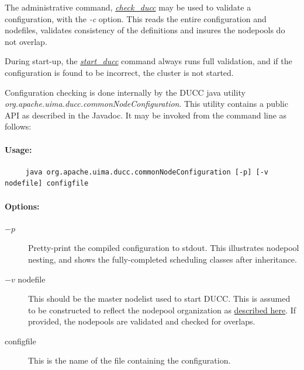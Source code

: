 The administrative command, \hyperref[subsec:admin.check-ducc]{\em check\_ducc} may be used to
validate a configuration, with the {\em -c} option.  This reads the entire configuration and
nodefiles, validates consistency of the definitions and insures the nodepools do not overlap.

During start-up, the \hyperref[subsec:admin.check-ducc]{\em start\_ducc} command always runs full validation, and if the
configuration is found to be incorrect, the cluster is not started.

Configuration checking is done internally by the DUCC java utility {\em
  org.apache.uima.ducc.commonNodeConfiguration}.  This utility contains a public
API as described in the Javadoc.  It may be invoked from the command line as follows:

    \paragraph{Usage:}
\begin{verbatim}
     java org.apache.uima.ducc.commonNodeConfiguration [-p] [-v nodefile] configfile
\end{verbatim}

    \paragraph{Options:}
    \begin{description}

      \item[$-p$] Pretty-print the compiled configuration to stdout. This illustrates
        nodepool nesting, and shows the fully-completed scheduling classes after inheritance.

      \item[$-v$ nodefile] This should be the master nodelist used to start DUCC.  This
        is assumed to be constructed to reflect the nodepool organization as 
        \hyperref[sec:admin-ducc.nodes]{described here}.  If provided,
        the nodepools are validated and checked for overlaps.

      \item[configfile] This is the name of the file containing the configuration.
    \end{description}
    
